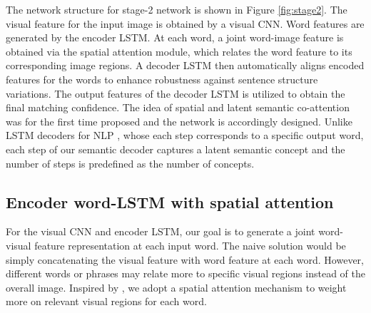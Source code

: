 The network structure for stage-2 network is shown in Figure \ref{fig:stage2}. The visual feature for the input image is obtained by a visual CNN.
Word features are generated by the encoder LSTM. At each word, a joint word-image feature is obtained via the spatial attention module, which relates the word feature to its corresponding image regions.
A decoder LSTM then automatically aligns encoded features for the words to enhance robustness against sentence structure variations. The output features of the decoder LSTM is utilized to obtain the final matching confidence.
The idea of spatial and latent semantic co-attention was for the first time proposed and the network is accordingly designed. Unlike LSTM decoders for NLP \cite{bahdanau2014neural,vinyals2015show}, whose each step corresponds to a specific output word, each step of our semantic decoder captures a latent semantic concept and the number of steps is predefined as the number of concepts.

\subsection{Encoder word-LSTM with spatial attention}
For the visual CNN and encoder LSTM, our goal is to generate a joint word-visual feature representation at each input word. The naive solution would be simply concatenating the visual feature with word feature at each word.
However, different words or phrases may relate more to specific visual regions instead of the overall image. Inspired by \cite{vinyals2015show}, we adopt a spatial attention mechanism to weight more on relevant visual regions for each word.

